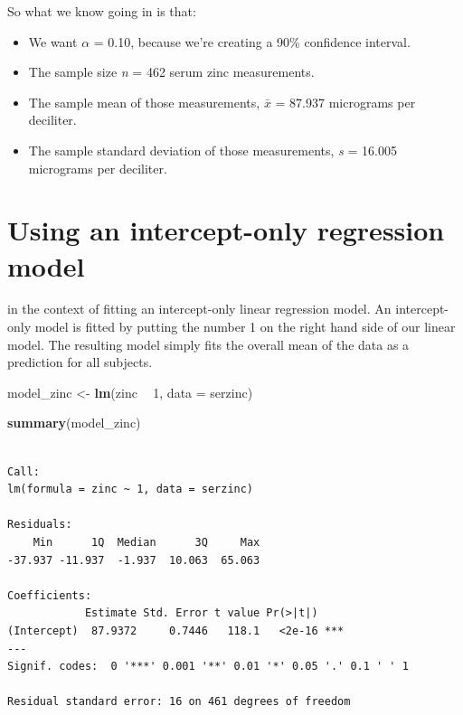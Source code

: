 \documentclass[
]{book}
\newenvironment{Shaded}{\begin{snugshade}}{\end{snugshade}}
\newcommand{\DataTypeTok}[1]{\textcolor[rgb]{0.13,0.29,0.53}{#1}}
\newcommand{\DecValTok}[1]{\textcolor[rgb]{0.00,0.00,0.81}{#1}}
\newcommand{\KeywordTok}[1]{\textcolor[rgb]{0.13,0.29,0.53}{\textbf{#1}}}
\newcommand{\NormalTok}[1]{#1}
\newcommand{\OperatorTok}[1]{\textcolor[rgb]{0.81,0.36,0.00}{\textbf{#1}}}
\newcommand{\StringTok}[1]{\textcolor[rgb]{0.31,0.60,0.02}{#1}}
\providecommand{\tightlist}{%
  \setlength{\itemsep}{0pt}\setlength{\parskip}{0pt}}
\begin{document}
So what we know going in is that:

\begin{itemize}
\tightlist
\item
  We want \(\alpha\) = 0.10, because we're creating a 90\% confidence interval.
\item
  The sample size \emph{n} = 462 serum zinc measurements.
\item
  The sample mean of those measurements, \(\bar{x}\) = 87.937 micrograms per deciliter.
\item
  The sample standard deviation of those measurements, \emph{s} = 16.005 micrograms per deciliter.
\end{itemize}

\hypertarget{using-an-intercept-only-regression-model}{%
\section{Using an intercept-only regression model}\label{using-an-intercept-only-regression-model}}

in the context of fitting an intercept-only linear regression model. An intercept-only model is fitted by putting the number 1 on the right hand side of our linear model. The resulting model simply fits the overall mean of the data as a prediction for all subjects.

\begin{Shaded}
\begin{Highlighting}[]
\NormalTok{model_zinc <-}\StringTok{ }\KeywordTok{lm}\NormalTok{(zinc }\OperatorTok{~}\StringTok{ }\DecValTok{1}\NormalTok{, }\DataTypeTok{data =}\NormalTok{ serzinc)}
\end{Highlighting}
\end{Shaded}

\begin{Shaded}
\begin{Highlighting}[]
\KeywordTok{summary}\NormalTok{(model_zinc)}
\end{Highlighting}
\end{Shaded}

\begin{verbatim}

Call:
lm(formula = zinc ~ 1, data = serzinc)

Residuals:
    Min      1Q  Median      3Q     Max 
-37.937 -11.937  -1.937  10.063  65.063 

Coefficients:
            Estimate Std. Error t value Pr(>|t|)    
(Intercept)  87.9372     0.7446   118.1   <2e-16 ***
---
Signif. codes:  0 '***' 0.001 '**' 0.01 '*' 0.05 '.' 0.1 ' ' 1

Residual standard error: 16 on 461 degrees of freedom
\end{verbatim}
\end{document}
